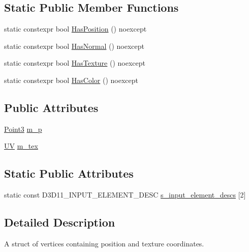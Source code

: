 \subsection*{Static Public Member Functions}
\begin{DoxyCompactItemize}
\item 
static constexpr bool \mbox{\hyperlink{structmage_1_1rendering_1_1_vertex_position_texture_a251093bc0caad749852ab5138f306909}{Has\+Position}} () noexcept
\item 
static constexpr bool \mbox{\hyperlink{structmage_1_1rendering_1_1_vertex_position_texture_abd20ebeb7462cc449cd4a41cf4d6c2c9}{Has\+Normal}} () noexcept
\item 
static constexpr bool \mbox{\hyperlink{structmage_1_1rendering_1_1_vertex_position_texture_aee946b0a6ec454ed0e6d0614965fb2ad}{Has\+Texture}} () noexcept
\item 
static constexpr bool \mbox{\hyperlink{structmage_1_1rendering_1_1_vertex_position_texture_a66d7754ec7a271ec3af1883774876646}{Has\+Color}} () noexcept
\end{DoxyCompactItemize}
\subsection*{Public Attributes}
\begin{DoxyCompactItemize}
\item 
\mbox{\hyperlink{structmage_1_1_point3}{Point3}} \mbox{\hyperlink{structmage_1_1rendering_1_1_vertex_position_texture_ae296d14afcc5b58ee99a1575d87f1e0f}{m\+\_\+p}}
\item 
\mbox{\hyperlink{structmage_1_1_u_v}{UV}} \mbox{\hyperlink{structmage_1_1rendering_1_1_vertex_position_texture_a958b1fdb6353ebc269606b9fcd8ab3d3}{m\+\_\+tex}}
\end{DoxyCompactItemize}
\subsection*{Static Public Attributes}
\begin{DoxyCompactItemize}
\item 
static const D3\+D11\+\_\+\+I\+N\+P\+U\+T\+\_\+\+E\+L\+E\+M\+E\+N\+T\+\_\+\+D\+E\+SC \mbox{\hyperlink{structmage_1_1rendering_1_1_vertex_position_texture_ade58ac70fb8177765cb73ba463acdd75}{s\+\_\+input\+\_\+element\+\_\+descs}} \mbox{[}2\mbox{]}
\end{DoxyCompactItemize}


\subsection{Detailed Description}
A struct of vertices containing position and texture coordinates. 

